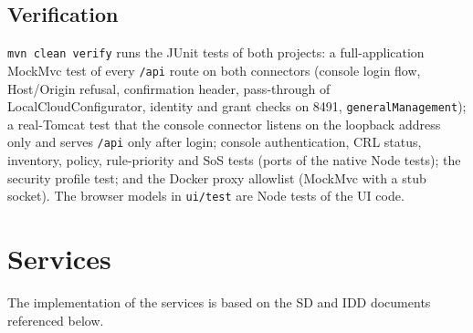 \documentclass[a4paper]{arrowhead}
\begin{document}
\subsection{Verification}

\texttt{mvn clean verify} runs the JUnit tests of both projects: a full-application MockMvc test of every \texttt{/api} route on both connectors (console login flow, Host/Origin refusal, confirmation header, pass-through of LocalCloudConfigurator, identity and grant checks on 8491, \texttt{general\allowbreak{}Management}); a real-Tomcat test that the console connector listens on the loopback address only and serves \texttt{/api} only after login; console authentication, CRL status, inventory, policy, rule-priority and SoS tests (ports of the native Node tests); the security profile test; and the Docker proxy allowlist (MockMvc with a stub socket). The browser models in \texttt{ui/\allowbreak{}test} are Node tests of the UI code.

\newpage

\section{Services}
\label{sec:services}

The implementation of the services is based on the SD and IDD documents referenced below.
\end{document}
